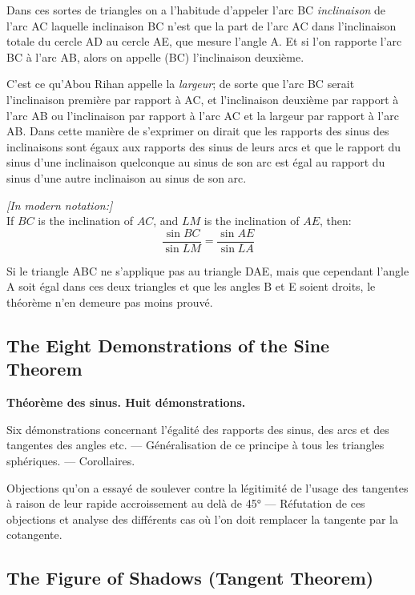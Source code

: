 \documentclass[11pt,a4paper]{article}
\theoremstyle{plain}
\theoremstyle{definition}
\theoremstyle{remark}
\begin{document}
Dans ces sortes de triangles on a l'habitude d'appeler l'arc BC \textit{inclinaison} de l'arc AC laquelle inclinaison BC n'est que la part de l'arc AC dans l'inclinaison totale du cercle AD au cercle AE, que mesure l'angle A. Et si l'on rapporte l'arc BC à l'arc AB, alors on appelle (BC) l'inclinaison deuxième.

C'est ce qu'Abou Rihan appelle la \textit{largeur}; de sorte que l'arc BC serait l'inclinaison première par rapport à AC, et l'inclinaison deuxième par rapport à l'arc AB ou l'inclinaison par rapport à l'arc AC et la largeur par rapport à l'arc AB. Dans cette manière de s'exprimer on dirait que les rapports des sinus des inclinaisons sont égaux aux rapports des sinus de leurs arcs et que le rapport du sinus d'une inclinaison quelconque au sinus de son arc est égal au rapport du sinus d'une autre inclinaison au sinus de son arc.


\noindent\textit{[In modern notation:]}\\
If $BC$ is the inclination of $AC$, and $LM$ is the inclination of $AE$, then:
\[
\frac{\sin BC}{\sin LM} = \frac{\sin AE}{\sin LA}
\]


Si le triangle ABC ne s'applique pas au triangle DAE, mais que cependant l'angle A soit égal dans ces deux triangles et que les angles B et E soient droits, le théorème n'en demeure pas moins prouvé.


\subsection{The Eight Demonstrations of the Sine Theorem}
\label{sec:sine-theorem}


\textbf{Théorème des sinus. Huit démonstrations.}

Six démonstrations concernant l'égalité des rapports des sinus, des arcs et des tangentes des angles etc. --- Généralisation de ce principe à tous les triangles sphériques. --- Corollaires.

Objections qu'on a essayé de soulever contre la légitimité de l'usage des tangentes à raison de leur rapide accroissement au delà de 45° --- Réfutation de ces objections et analyse des différents cas où l'on doit remplacer la tangente par la cotangente.


\subsection{The Figure of Shadows (Tangent Theorem)}
\label{sec:shadows}
\end{document}

